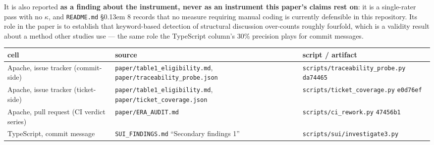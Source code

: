\documentclass[conference]{IEEEtran}
\begin{document}
It is also reported \textbf{as a finding about the instrument, never as an instrument this paper's claims rest on}: it is a single-rater pass with no $\kappa$, and \texttt{README.\allowbreak{}md} \S\kern0.13em 8 records that no measure requiring manual coding is currently defensible in this repository. Its role in the paper is to establish that keyword-based detection of structural discussion over-counts roughly fourfold, which is a validity result about a method other studies use --- the same role the TypeScript column's 30\% precision plays for commit messages.



\begin{table}[htbp]

\centering

\begingroup\footnotesize\setlength{\tabcolsep}{3pt}

\begin{tabular}{>{\raggedright\arraybackslash}p{}>{\raggedright\arraybackslash}p{}>{\raggedright\arraybackslash}p{}}

\toprule

\textbf{cell} & \textbf{source} & \textbf{script / artifact} \\

\midrule

Apache, issue tracker (commit-\allowbreak{}side) & \texttt{paper/\allowbreak{}table1\_\allowbreak{}eligibility.\allowbreak{}md}, \texttt{paper/\allowbreak{}traceability\_\allowbreak{}probe.\allowbreak{}json} & \texttt{scripts/\allowbreak{}traceability\_\allowbreak{}probe.\allowbreak{}py} \texttt{da74465} \\

Apache, issue tracker (ticket-\allowbreak{}side) & \texttt{paper/\allowbreak{}table1\_\allowbreak{}eligibility.\allowbreak{}md}, \texttt{paper/\allowbreak{}ticket\_\allowbreak{}coverage.\allowbreak{}json} & \texttt{scripts/\allowbreak{}ticket\_\allowbreak{}coverage.\allowbreak{}py} \texttt{e0d76ef} \\

Apache, pull request (CI verdict series) & \texttt{paper/\allowbreak{}ERA\_\allowbreak{}AUDIT.\allowbreak{}md} & \texttt{scripts/\allowbreak{}ci\_\allowbreak{}rework.\allowbreak{}py} \texttt{47456b1} \\

TypeScript, commit message & \texttt{SUI\_\allowbreak{}FINDINGS.\allowbreak{}md} ``Secondary findings 1'' & \texttt{scripts/\allowbreak{}sui/\allowbreak{}investigate3.\allowbreak{}py} \\


\end{tabular}
\end{table}
\end{document}
